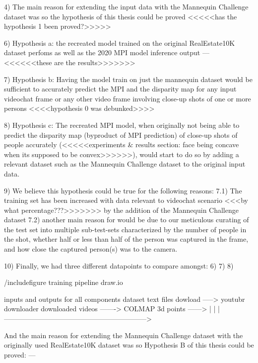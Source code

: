 4) The main reason for extending the input data with the Mannequin Challenge dataset was so the hypothesis of this thesis could be proved <<<<<has the hypothesis 1 been proved?>>>>>

6) Hypothesis a: the recreated model trained on the original RealEstate10K dataset perfoms as well as the 2020 MPI model inference output --- <<<<<<these are the results>>>>>>> 

7) Hypothesis b: Having the model train on just the mannequin dataset would be sufficient to accurately predict the MPI and the disparity map for any input videochat frame or any other video frame involving close-up shots of one or more persons <<<<hypothesis 0 was debunked>>>>

8) Hypothesis c: The recreated MPI model, when originally not being able to predict the disparity map (byproduct of MPI prediction) of close-up shots of people accurately (<<<<<experiments & results section: face being concave when its supposed to be convex>>>>>>), would start to do so by adding a relevant dataset such as the Mannequin Challenge dataset to the original input data.

9) We believe this hypothesis could be true for the following reasons: 
    7.1) The training set has been increased with data relevant to videochat scenario <<<by what percentage???>>>>>>> by the addition of the Mannequin Challenge dataset
    7.2) another main reason for would be due to our meticulous curating of the test set into multiple sub-test-sets characterized by the number of people in the shot, whether half or less than half of the person was captured in the frame, and how close the captured person(s) was to the camera.

10) Finally, we had three different datapoints to compare amongst: 6) 7) 8)



 
/include{figure} training pipeline 
draw.io


inputs and outputs for all components 
dataset text files dowload -----> youtubr downloader downloaded videos -------> COLMAP 3d points ------> 
                                        |
                                        |
                                        |-------------------------------------------------------------->




And the main reason for extending the Mannequin Challenge dataset with the originally used RealEstate10K dataset was so Hypothesis B of this thesis could be proved: ---

